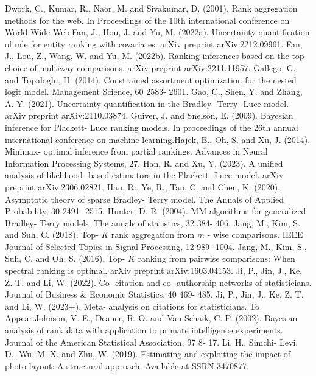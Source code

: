 Dwork, C., Kumar, R., Naor, M. and Sivakumar, D. (2001). Rank
aggregation methods for the web. In Proceedings of the 10th
international conference on World Wide Web.Fan, J., Hou, J. and Yu, M.
(2022a). Uncertainty quantification of mle for entity ranking with
covariates. arXiv preprint arXiv:2212.09961. Fan, J., Lou, Z., Wang, W.
and Yu, M. (2022b). Ranking inferences based on the top choice of
multiway comparisons. arXiv preprint arXiv:2211.11957. Gallego, G. and
Topaloglu, H. (2014). Constrained assortment optimization for the nested
logit model. Management Science, 60 2583- 2601. Gao, C., Shen, Y. and
Zhang, A. Y. (2021). Uncertainty quantification in the Bradley- Terry-
Luce model. arXiv preprint arXiv:2110.03874. Guiver, J. and Snelson, E.
(2009). Bayesian inference for Plackett- Luce ranking models. In
proceedings of the 26th annual international conference on machine
learning.Hajek, B., Oh, S. and Xu, J. (2014). Minimax- optimal inference
from partial rankings. Advances in Neural Information Processing
Systems, 27. Han, R. and Xu, Y. (2023). A unified analysis of
likelihood- based estimators in the Plackett- Luce model. arXiv preprint
arXiv:2306.02821. Han, R., Ye, R., Tan, C. and Chen, K. (2020).
Asymptotic theory of sparse Bradley- Terry model. The Annals of Applied
Probability, 30 2491- 2515. Hunter, D. R. (2004). MM algorithms for
generalized Bradley- Terry models. The annals of statistics, 32 384-
406. Jang, M., Kim, S. and Suh, C. (2018). Top- \(K\) rank aggregation
from \(m\) - wise comparisons. IEEE Journal of Selected Topics in Signal
Processing, 12 989- 1004. Jang, M., Kim, S., Suh, C. and Oh, S. (2016).
Top- \(K\) ranking from pairwise comparisons: When spectral ranking is
optimal. arXiv preprint arXiv:1603.04153. Ji, P., Jin, J., Ke, Z. T. and
Li, W. (2022). Co- citation and co- authorship networks of
statisticians. Journal of Business \& Economic Statistics, 40 469- 485.
Ji, P., Jin, J., Ke, Z. T. and Li, W. (2023+). Meta- analysis on
citations for statisticians. To Appear.Johnson, V. E., Deaner, R. O. and
Van Schaik, C. P. (2002). Bayesian analysis of rank data with
application to primate intelligence experiments. Journal of the American
Statistical Association, 97 8- 17. Li, H., Simchi- Levi, D., Wu, M. X.
and Zhu, W. (2019). Estimating and exploiting the impact of photo
layout: A structural approach. Available at SSRN 3470877.

